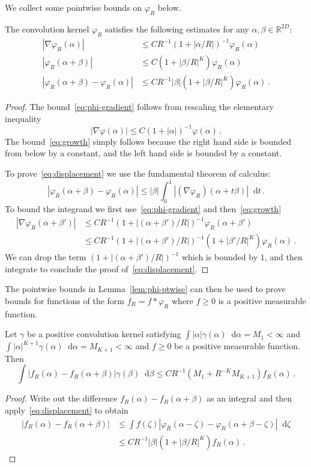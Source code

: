 \documentclass[11pt]{amsart}
\def\Real{{\mathbb R}}
\newcommand{\diff}{\mathop{}\!\mathrm{d}}
\numberwithin{equation}{section}
\begin{document}
We collect some pointwise bounds on $\varphi_R$ below.

\begin{lemma}
\label{lem:phi-ptwise}
The convolution kernel $\varphi_R$ satisfies the following estimates for any $\alpha,\beta\in\Real^{2D}$:
\begin{align}
\label{eq:phi-gradient}
|\nabla \varphi_R(\alpha)| &\leq C R^{-1} (1+|\alpha/R|)^{-1} \varphi_R(\alpha) \\
\label{eq:growth}
|\varphi_R(\alpha+\beta)| &\leq C (1+|\beta/R|^K) \varphi_R(\alpha) \\
\label{eq:displacement}
|\varphi_R(\alpha+\beta) - \varphi_R(\alpha)| &\leq C R^{-1} |\beta| (1+|\beta/R|^K) \varphi_R(\alpha)\,.
\end{align}
\end{lemma}
\begin{proof}
The bound~\eqref{eq:phi-gradient} follows from rescaling the elementary inequality
\[
|\nabla \varphi(\alpha)| \leq C (1+|\alpha|)^{-1} \varphi(\alpha)\,.
\]
The bound~\eqref{eq:growth} simply follows because the right hand side is bounded from below by a constant, and the left hand side is bounded by a constant.

To prove~\eqref{eq:displacement} we use the fundamental theorem of calculus:
\[
|\varphi_R(\alpha+\beta) - \varphi_R(\alpha)| \leq |\beta|\int_0^1 |(\nabla \varphi_R)(\alpha+t\beta)|\diff t\,.
\]
To bound the integrand we first use~\eqref{eq:phi-gradient} and then~\eqref{eq:growth}
\begin{align*}
|\nabla\varphi_R(\alpha+\beta')|
&\leq C R^{-1} (1+|(\alpha+\beta')/R|)^{-1} \varphi_R(\alpha+\beta') \\
&\leq C R^{-1} (1+|(\alpha+\beta')/R|)^{-1} (1+|\beta'/R|^K) \varphi_R(\alpha)\,.
\end{align*}
We can drop the term $(1+|(\alpha+\beta')/R|)^{-1}$ which is bounded by $1$, and then integrate to conclude
the proof of~\eqref{eq:displacement}.
\end{proof}

The pointwise bounds in Lemma~\ref{lem:phi-ptwise} can then be used to prove bounds for
functions of the form $f_R = f\ast \varphi_R$ where $f\geq 0$ is a positive measurable function.
\begin{lemma}
\label{lem:phi-conv}
Let $\gamma$ be a positive convolution kernel satisfying $\int |\alpha|\gamma(\alpha)\diff \alpha = M_1<\infty$
and $\int |\alpha|^{K+1} \gamma(\alpha)\diff \alpha = M_{K+1} <\infty$ and $f\geq 0$ be a positive measurable function.
Then
\[
\int |f_R(\alpha) - f_R(\alpha+\beta)|\gamma(\beta)\diff \beta \leq C R^{-1}(M_1 + R^{-K} M_{K+1})f_R(\alpha)\,.
\]
\end{lemma}
\begin{proof}
Write out the difference $f_R(\alpha)-f_R(\alpha+\beta)$ as an integral and then apply~\eqref{eq:displacement}
to obtain
\begin{align*}
|f_R(\alpha) - f_R(\alpha+\beta)|
&\leq \int f(\zeta) |\varphi_R(\alpha-\zeta) - \varphi_R(\alpha+\beta-\zeta)| \diff \zeta\\
&\leq CR^{-1}|\beta| (1+|\beta/R|^K) f_R(\alpha)\,.
\end{align*}
\end{proof}
\end{document}

